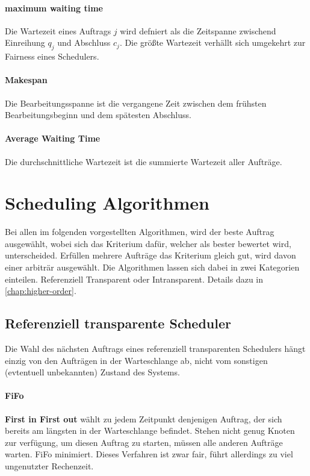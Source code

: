 \paragraph{maximum waiting time}
Die Wartezeit eines Auftrags $j$ wird defniert als die Zeitspanne zwischend Einreihung $q_j$ und Abschluss $c_j$. Die größte Wartezeit verhällt sich umgekehrt zur Fairness eines Schedulers.

\paragraph{Makespan}
Die Bearbeitungsspanne ist die vergangene Zeit zwischen dem frühsten Bearbeitungsbeginn und dem spätesten Abschluss.

\paragraph{Average Waiting Time}
Die durchschnittliche Wartezeit ist die summierte Wartezeit aller Aufträge.

\section{Scheduling Algorithmen}
Bei allen im folgenden vorgestellten Algorithmen, wird der beste Auftrag ausgewählt, wobei sich das Kriterium dafür, welcher als bester bewertet wird, unterscheided. Erfüllen mehrere Aufträge das Kriterium gleich gut, wird davon einer arbiträr ausgewählt. Die Algorithmen lassen sich dabei in zwei Kategorien einteilen.  Referenziell Transparent oder Intransparent. Details dazu in \ref{chap:higher-order}.

\subsection{Referenziell transparente Scheduler}
Die Wahl des nächsten Auftrags eines referenziell transparenten Schedulers hängt einzig von den Aufträgen in der Warteschlange ab, nicht vom sonstigen (evtentuell unbekannten) Zustand des Systems.

\paragraph{FiFo}
\textbf{First in First out} wählt zu jedem Zeitpunkt denjenigen Auftrag, der sich bereits am längsten in der Warteschlange befindet. Stehen nicht genug Knoten zur verfügung, um diesen Auftrag zu starten, müssen alle anderen Aufträge warten. FiFo minimiert. Dieses Verfahren ist zwar fair, führt allerdings zu viel ungenutzter Rechenzeit.

